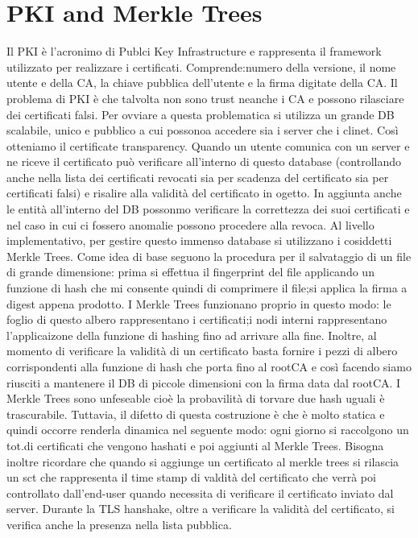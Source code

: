\documentclass{article}
\begin{document}
\section{PKI and Merkle Trees}
Il PKI è l'acronimo di Publci Key Infrastructure e rappresenta il framework utilizzato per realizzare i certificati\@. Comprende:\@il numero della versione, il nome utente e della CA, la chiave pubblica dell'utente e la firma digitate della CA\@. Il problema di PKI è che talvolta non sono trust neanche i CA e possono rilasciare dei certificati falsi\@.\newline
Per ovviare a questa problematica si utilizza un grande DB scalabile, unico e pubblico a cui possonoa accedere sia i server che i clinet\@. Così otteniamo il certificate transparency\@. Quando un utente comunica con un server e ne riceve il certificato può verificare all'interno di questo database (controllando anche nella lista dei certificati revocati sia per scadenza del certificato sia per certificati falsi) e risalire alla validità del certificato in ogetto\@.
In aggiunta anche le entità all'interno del DB possonmo verificare la correttezza dei suoi certificati e nel caso in cui ci fossero anomalie possono procedere alla revoca\@.\newline
Al livello implementativo, per gestire questo immenso database si utilizzano i cosiddetti Merkle Trees\@. Come idea di base seguono la procedura per il salvataggio di un file di grande dimensione: prima si effettua il fingerprint del file applicando un funzione di hash che mi consente quindi di comprimere il file;\@poi si applica la firma a digest appena prodotto\@.\newline
I Merkle Trees funzionano proprio in questo modo: le foglio di questo albero rappresentano i certificati;\@mentre i nodi interni rappresentano l'applicaizone della funzione di hashing fino ad arrivare alla fine\@. Inoltre, al momento di verificare la validità di un certificato basta fornire i pezzi di albero corrispondenti alla funzione di hash che porta fino al rootCA e così facendo siamo riusciti a mantenere il DB di piccole dimensioni con la firma data dal rootCA\@. I Merkle Trees sono unfeseable cioè la probavilità di torvare due hash uguali è trascurabile\@.\newline
Tuttavia, il difetto di questa costruzione è che è molto statica e quindi occorre renderla dinamica nel seguente modo: ogni giorno si raccolgono un tot.di certificati che vengono hashati e poi aggiunti al Merkle Trees\@. Bisogna inoltre ricordare che quando si aggiunge un certificato al merkle trees si rilascia un sct che rappresenta il time stamp di valdità del certificato che verrà poi controllato dall'end-user quando necessita di verificare il certificato inviato dal server\@. Durante la TLS hanshake, oltre a verificare la validità del certificato, si verifica anche la presenza nella lista pubblica\@.
\end{document}
